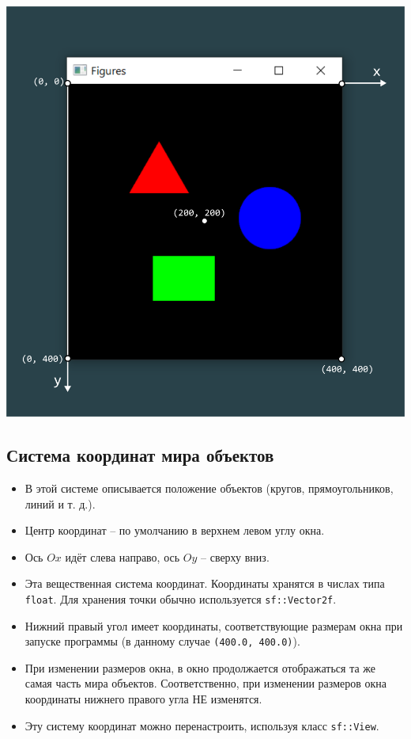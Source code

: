 \documentclass{article}
\begin{document}
\vspace{1cm}
\begin{center}
\includegraphics[scale=0.9]{../images/system_pixels.png}
\end{center}



\subsection*{Система координат мира объектов}
\begin{itemize}
\item В этой системе описывается положение объектов (кругов, прямоугольников, линий и т. д.).
\item Центр координат -- по умолчанию в верхнем левом углу окна. 
\item Ось $Ox$ идёт слева направо, ось $Oy$ -- сверху вниз.
\item Эта вещественная система координат. Координаты хранятся в числах типа \texttt{float}. Для хранения точки обычно используется \texttt{sf::Vector2f}.
\item Нижний правый угол имеет координаты, соответствующие размерам окна при запуске программы (в данному случае \texttt{(400.0, 400.0)}).
\item При изменении размеров окна, в окно продолжается отображаться та же самая часть мира объектов.
Соответственно, при изменении размеров окна координаты нижнего правого угла НЕ изменятся.
\item Эту систему координат можно перенастроить, используя класс \texttt{sf::View}.
\end{itemize}
\end{document}
